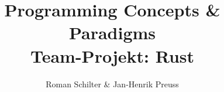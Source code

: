\documentclass[aspectratio=169, professionalfonts]{beamer}
\title[PCP-Rust]{Programming Concepts \& Paradigms\\ Team-Projekt: Rust}
\author[Schilter \& Preuss]{Roman Schilter \& Jan-Henrik Preuss}
\begin{document}
\typesetFrontSlides














\end{document}
